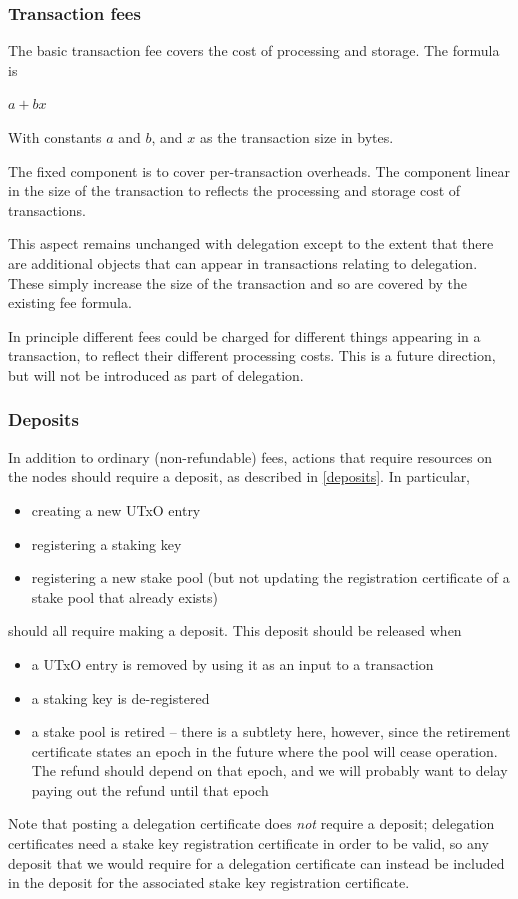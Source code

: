 \documentclass[11pt,a4paper]{article}
\begin{document}
\subsubsection{Transaction fees}
\label{transaction-fees}

The basic transaction fee covers the cost of processing and storage. The
formula is

\(a + b x\)

With constants \(a\) and \(b\), and \(x\) as the transaction size in
bytes.

The fixed component is to cover per-transaction overheads. The component
linear in the size of the transaction to reflects the processing and
storage cost of transactions.

This aspect remains unchanged with delegation except to the extent that
there are additional objects that can appear in transactions relating to
delegation. These simply increase the size of the transaction and so are
covered by the existing fee formula.

In principle different fees could be charged for different things
appearing in a transaction, to reflect their different processing costs.
This is a future direction, but will not be introduced as part of
delegation.

\subsubsection{Deposits}
\label{fees-deposits}

In addition to ordinary (non-refundable) fees, actions that require
resources on the nodes should require a deposit, as described in
\cref{deposits}. In particular,
\begin{itemize}
\item creating a new UTxO entry
\item registering a staking key
\item registering a new stake pool (but not updating the registration
  certificate of a stake pool that already exists)
\end{itemize}
should all require making a deposit. This deposit should be released
when
\begin{itemize}
\item a UTxO entry is removed by using it as an input to a transaction
\item a staking key is de-registered
\item a stake pool is retired -- there is a subtlety here, however,
  since the retirement certificate states an epoch in the future where
  the pool will cease operation. The refund should depend on that
  epoch, and we will probably want to delay paying out the refund
  until that epoch
\end{itemize}
Note that posting a delegation certificate does \emph{not} require a
deposit; delegation certificates need a stake key registration
certificate in order to be valid, so any deposit that we would require
for a delegation certificate can instead be included in the deposit
for the associated stake key registration certificate.
\end{document}
